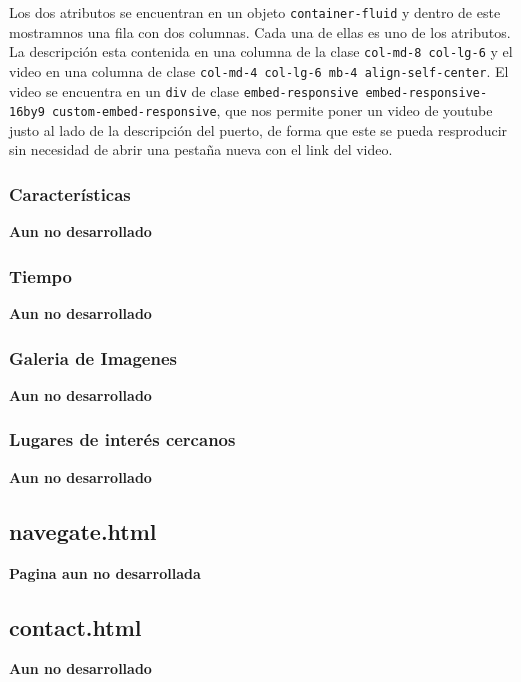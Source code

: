 \documentclass{article}
\begin{document}
\noindent Los dos atributos se encuentran en un objeto \texttt{container-fluid} y dentro de este mostramnos una fila con dos columnas. Cada una de ellas es uno de los atributos. La descripción esta contenida en una columna de la clase \texttt{col-md-8 col-lg-6} y el video en una columna de clase \texttt{col-md-4 col-lg-6 mb-4 align-self-center}. El video se encuentra en un \texttt{div} de clase \texttt{embed-responsive embed-responsive-16by9 custom-embed-responsive}, que nos permite poner un video de youtube justo al lado de la descripción del puerto, de forma que este se pueda resproducir sin necesidad de abrir una pestaña nueva con el link del video.

\subsubsection{Características}
\textbf{Aun no desarrollado}
\subsubsection{Tiempo}
\textbf{Aun no desarrollado}
\subsubsection{Galeria de Imagenes}
\textbf{Aun no desarrollado}
\subsubsection{Lugares de interés cercanos}
\textbf{Aun no desarrollado}

\subsection{navegate.html}
\textbf{Pagina aun no desarrollada}

\subsection{contact.html}
\textbf{Aun no desarrollado}
\end{document}
